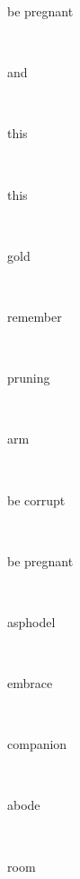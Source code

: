 \documentclass[a4paper]{article}
\begin{document}
\begin{multicols}{4}
\begin{multicols}{4}
\begin{multicols}{5}
{\hebrewfont{}} \begin{english}be pregnant\end{english}\\
{\hebrewfont{}} \begin{english}and\end{english}\\
{\hebrewfont{}} \begin{english}this\end{english}\\
{\hebrewfont{}} \begin{english}this\end{english}\\
{\hebrewfont{}} \begin{english}gold\end{english}\\
{\hebrewfont{}} \begin{english}remember\end{english}\\
{\hebrewfont{}} \begin{english}pruning\end{english}\\
{\hebrewfont{}} \begin{english}arm\end{english}\\
{\hebrewfont{}} \begin{english}be corrupt\end{english}\\
{\hebrewfont{}} \begin{english}be pregnant\end{english}\\
{\hebrewfont{}} \begin{english}asphodel\end{english}\\
{\hebrewfont{}} \begin{english}embrace\end{english}\\
{\hebrewfont{}} \begin{english}companion\end{english}\\
{\hebrewfont{}} \begin{english}abode\end{english}\\
{\hebrewfont{}} \begin{english}room\end{english}\\

\end{multicols}
\end{multicols}
\end{multicols}
\end{document}
